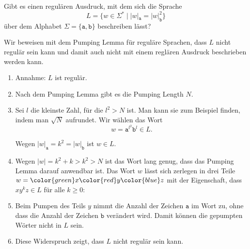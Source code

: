 Gibt es einen regulären Ausdruck, mit dem sich die Sprache
\[
L=\{w\in\Sigma^*\;|\; |w|_{\texttt{a}} = |w|_{\texttt{b}}^2\}
\]
über dem Alphabet $\Sigma=\{\texttt{a},\texttt{b}\}$
beschreiben lässt?


\begin{loesung}
Wir beweisen mit dem Pumping Lemma für reguläre Sprachen, dass $L$
nicht regulär sein kann und damit auch nicht mit einem reglären Ausdruck
beschrieben werden kann.
\begin{enumerate}
\item Annahme: $L$ ist regulär.
\item Nach dem Pumping Lemma gibt es die Pumping Length $N$.
\item Sei $l$ die kleinste Zahl, für die $l^2>N$ ist. 
Man kann sie zum Beispiel finden, indem man $\sqrt{N}$ aufrundet.
Wir wählen das Wort
\[
w
=
\texttt{a}^{l^2}\texttt{b}^l
\in
L.
\]
\begin{center}
\end{center}
Wegen $|w|_{\texttt{a}} = k^2 = |w|_{\texttt{b}}$ ist $w\in L$.
\item
Wegen $|w|=k^2+k>k^2>N$ ist das Wort lang genug, dass das Pumping Lemma
darauf anwendbar ist.
Das Wort $w$ lässt sich zerlegen in drei Teile
$w={\color{green}x}{\color{red}y}{\color{blue}z}$ mit der
Eigenschaft, dass $xy^kz\in L$ für alle $k\ge 0$:
\begin{center}
\end{center}
\item
Beim Pumpen des Teils $y$ nimmt die Anzahl der Zeichen $\texttt{a}$ 
im Wort zu, ohne dass die Anzahl der Zeichen $\texttt{b}$ verändert wird.
Damit können die gepumpten Wörter nicht in $L$ sein.
\item Diese Widerspruch zeigt, dass $L$ nicht regulär sein kann.
\qedhere
\end{enumerate}
\end{loesung}

